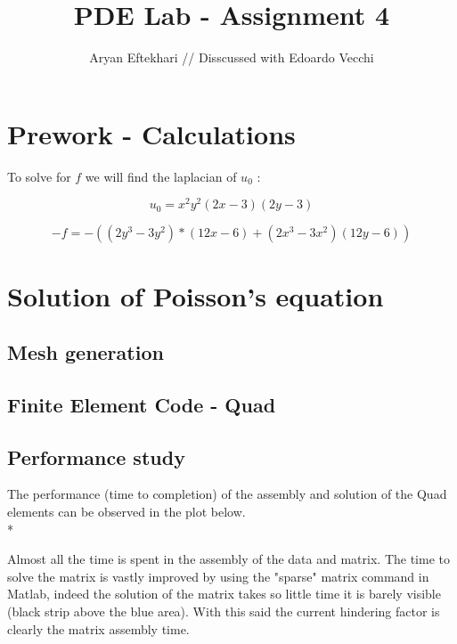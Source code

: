 \documentclass[unicode,11pt,a4paper,twoside,numbers=endperiod,openany]{article}
\author{Aryan Eftekhari // Disscussed with Edoardo Vecchi}
\title{PDE Lab - Assignment 4}
\begin{document}
\maketitle
\newpage









\section{Prework  - Calculations}
To solve for $f$ we will find the laplacian of $u_0$ :

$$ u_0 =x^2y^2(2x-3)(2y-3)$$

$$ -f  =  -((2y^3 - 3y^2)*(12x - 6) + (2x^3 - 3x^2)(12y - 6))$$

\section{Solution of Poisson's equation}
\subsection{Mesh generation}

\newpage










\subsection{Finite Element Code -  Quad}






\newpage











\subsection{Performance study}
The performance (time to completion) of the assembly and solution of the Quad elements can be observed in the plot below. 
\\*

Almost all the time is spent in the assembly of the data and matrix. The time to solve the matrix is vastly improved by using the "sparse" matrix command in Matlab, indeed the solution of the matrix takes so little time it is barely visible (black strip above the blue area). With this said the current hindering factor is clearly the matrix assembly time.
\end{document}
